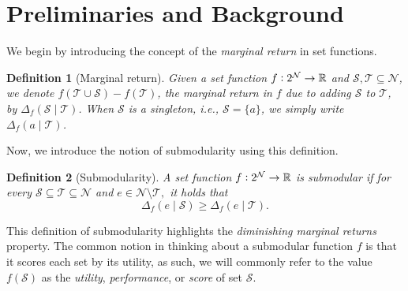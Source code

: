 \documentclass[letter,11pt]{article}
\newtheorem{definition}{Definition}[]
\def\sS{\mathcal{S}}
\def\sN{\mathcal{N}}
\begin{document}
\section{Preliminaries and Background}
We begin by introducing the concept of the \textit{marginal return} in set functions.
\begin{definition}[Marginal return]
Given a set function $f\vcentcolon2^\sN\rightarrow\mathbb{R}$ and $\mathcal{S}, \mathcal{T} \subseteq \sN$, we denote $f(\mathcal{T} \cup \mathcal{S}) - f(\mathcal{T})$, the \textit{marginal return} in $f$ due to adding $\mathcal{S}$ to $\mathcal{T}$, by $\Delta_f(\sS\mid\mathcal{T})$. When $\sS$ is a singleton, i.e., $\sS = \{a\}$, we simply write $\Delta_f(a\mid\mathcal{T})$.
\end{definition} 
Now, we introduce the notion of submodularity using this definition.
\begin{definition}[Submodularity]\label{def:submod}
A set function $f\vcentcolon2^\sN\rightarrow\mathbb{R}$ is \textit{submodular} if for every $\sS\subseteq \mathcal{T} \subseteq \sN$ and $e \in \sN \setminus \mathcal{T},$ it holds that
\begin{equation}
\Delta_f(e\mid\sS) \geq \Delta_f(e\mid\mathcal{T}).
\end{equation}
\end{definition}
This definition of submodularity highlights the \textit{diminishing marginal returns} property. 
The common notion in thinking about a submodular function $f$ is that it scores each set by its utility, as such, we will commonly refer to the value $f(\sS)$ as the \textit{utility}, \textit{performance}, or \textit{score} of set $\sS$.
\end{document}
